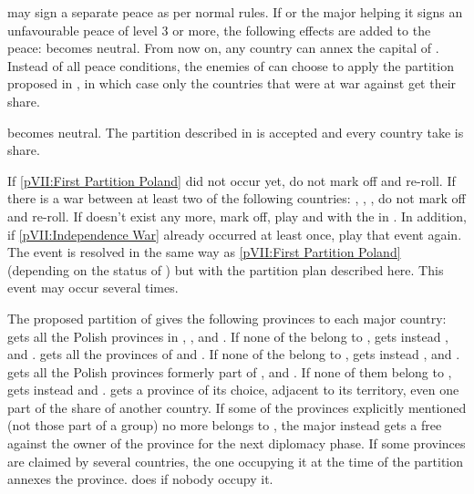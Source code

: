 \phpaix
\aparag \payspologne may sign a separate peace as per normal rules.
\aparag If \payspologne or the major helping it signs an unfavourable peace of
level 3 or more, the following effects are added to the peace:
\bparag \payspologne becomes neutral.
\bparag From now on, any country can annex the capital of \payspologne.
\bparag Instead of all peace conditions, the enemies of \payspologne can
choose to apply the partition proposed in , in
which case only the countries that were at war against \payspologne get their
share.



\phevnt
\aparag \payspologne becomes neutral.
\aparag The partition described in  is accepted
and every country take is share.





\condition{}
\aparag If \ref{pVII:First Partition Poland} did not occur yet, do not mark
off and re-roll.
\aparag If there is a war between at least two of the following countries:
\RUS, \AUS, \PRU, do not mark off and re-roll.
\aparag If \payspologne doesn't exist any more, mark off, play and \RD with
the \REVOLT in \POL.
\bparag In addition, if \ref{pVII:Independence War} already occurred at least
once, play that event again.
\aparag The event is resolved in the same way as \ref{pVII:First Partition
  Poland} (depending on the status of \payspologne) but with the partition
plan described here.
\aparag This event may occur several times.


\aparag The proposed partition of \payspologne gives the following provinces
to each major country:
\bparag \RUS gets all the Polish provinces in \regionUkraine,
\provinceSeveria, \provinceBaltarusija and \provincePolacak. If none of the
belong to \payspologne, \RUS gets instead \provinceLietuva, \provinceZemaitija
and \provincePrypec.
\bparag \PRU gets all the provinces of  and
. If none of the belong to \payspologne, \PRU gets
instead \provinceDanzig, \provinceWielkopolska and \provinceMazowia.
\bparag \AUS gets all the Polish provinces formerly part of \payshongrie,
\provinceMorava and \provinceMalopolska. If none of them belong to
\payspologne, \AUS gets instead \provinceWolyn and \provinceLublin.
\bparag \SUE gets a province of its choice, adjacent to its territory, even
one part of the share of another country.
\aparag If some of the provinces explicitly mentioned (not those part of a
group) no more belongs to \payspologne, the major instead gets a free \CB
against the owner of the province for the next diplomacy phase.
\aparag If some provinces are claimed by several countries, the one occupying
it at the time of the partition annexes the province. \SUE does if nobody
occupy it.



